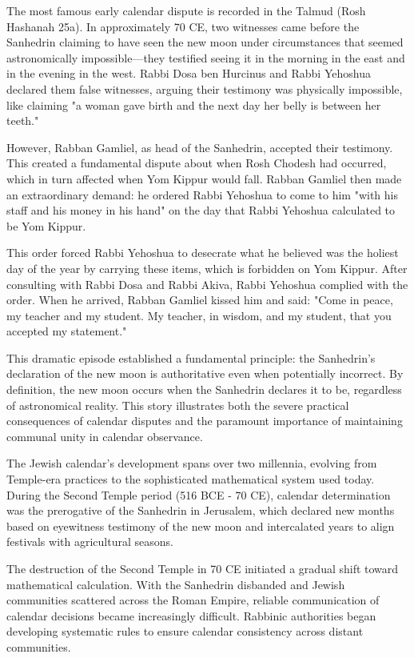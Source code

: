 \begin{historical}
The most famous early calendar dispute is recorded in the Talmud (Rosh Hashanah 25a). In approximately 70 CE, two witnesses came before the Sanhedrin claiming to have seen the new moon under circumstances that seemed astronomically impossible—they testified seeing it in the morning in the east and in the evening in the west. Rabbi Dosa ben Hurcinus and Rabbi Yehoshua declared them false witnesses, arguing their testimony was physically impossible, like claiming "a woman gave birth and the next day her belly is between her teeth."

However, Rabban Gamliel, as head of the Sanhedrin, accepted their testimony. This created a fundamental dispute about when Rosh Chodesh had occurred, which in turn affected when Yom Kippur would fall. Rabban Gamliel then made an extraordinary demand: he ordered Rabbi Yehoshua to come to him "with his staff and his money in his hand" on the day that Rabbi Yehoshua calculated to be Yom Kippur.

This order forced Rabbi Yehoshua to desecrate what he believed was the holiest day of the year by carrying these items, which is forbidden on Yom Kippur. After consulting with Rabbi Dosa and Rabbi Akiva, Rabbi Yehoshua complied with the order. When he arrived, Rabban Gamliel kissed him and said: "Come in peace, my teacher and my student. My teacher, in wisdom, and my student, that you accepted my statement."

This dramatic episode established a fundamental principle: the Sanhedrin's declaration of the new moon is authoritative even when potentially incorrect. By definition, the new moon occurs when the Sanhedrin declares it to be, regardless of astronomical reality. This story illustrates both the severe practical consequences of calendar disputes and the paramount importance of maintaining communal unity in calendar observance.

The Jewish calendar's development spans over two millennia, evolving from Temple-era practices to the sophisticated mathematical system used today. During the Second Temple period (516 BCE - 70 CE), calendar determination was the prerogative of the Sanhedrin in Jerusalem, which declared new months based on eyewitness testimony of the new moon and intercalated years to align festivals with agricultural seasons.

The destruction of the Second Temple in 70 CE initiated a gradual shift toward mathematical calculation. With the Sanhedrin disbanded and Jewish communities scattered across the Roman Empire, reliable communication of calendar decisions became increasingly difficult. Rabbinic authorities began developing systematic rules to ensure calendar consistency across distant communities.


\end{historical}
